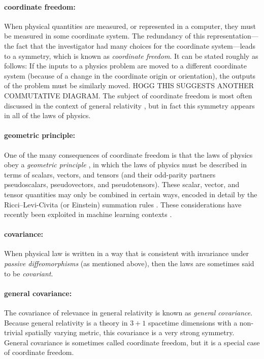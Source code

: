 \documentclass{article}
\begin{document}
\paragraph{coordinate freedom:}
When physical quantities are measured, or represented in a computer, they must be measured in some coordinate system.
The redundancy of this representation---the fact that the investigator had many choices for the coordinate system---leads to a symmetry, which is known as \emph{coordinate freedom}.
It can be stated roughly as follows:
If the inputs to a physics problem are moved to a different coordinate system (because of a change in the coordinate origin or orientation), the outputs of the problem must be similarly moved.
HOGG THIS SUGGESTS ANOTHER COMMUTATIVE DIAGRAM.
The subject of coordinate freedom is most often discussed in the context of general relativity \cite{gr}, but in fact this symmetry appears in all of the laws of physics.

\paragraph{geometric principle:}
One of the many consequences of coordinate freedom is that the laws of physics obey a \emph{geometric principle} \cite{mcp}, in which the laws of physics must be described in terms of scalars, vectors, and tensors (and their odd-parity partners pseudoscalars, pseudovectors, and pseudotensors).
These scalar, vector, and tensor quantities may only be combined in certain ways, encoded in detail by the Ricci--Levi-Civita (or Einstein) summation rules \cite{ricci, einsteinsummation}.
These considerations have recently been exploited in machine learning contexts \cite{villar2021scalars}.

\paragraph{covariance:}
When physical law is written in a way that is consistent with invariance under \emph{passive diffeomorphisms} (as mentioned above), then the laws are sometimes said to be \emph{covariant}.

\paragraph{general covariance:}
The covariance of relevance in general relativity \cite{einstein} is known as \emph{general covariance}.
Because general relativity is a theory in $3+1$ spacetime dimensions with a non-trivial spatially varying metric, this covariance is a very strong symmetry.
General covariance is sometimes called coordinate freedom, but it is a special case of coordinate freedom.
\end{document}
